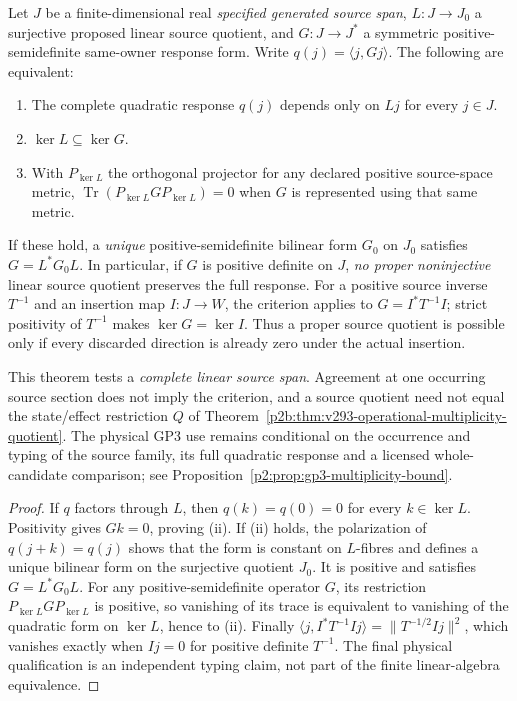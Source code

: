 \documentclass[11pt,a4paper]{article}
\begin{document}
\begin{theorem}
\label{p2f:thm:v296-source-quadratic-quotient}
Let $J$ be a finite-dimensional real \emph{specified generated source
span}, $L:J\to J_0$ a surjective proposed linear source quotient, and
$G:J\to J^*$ a symmetric positive-semidefinite same-owner response
form. Write $q(j)=\langle j,Gj\rangle$. The following are equivalent:
\begin{enumerate}[label=(\roman*),leftmargin=2em]
\item The complete quadratic response $q(j)$ depends only on $Lj$
for every $j\in J$.
\item $\ker L\subseteq\ker G$.
\item With $P_{\ker L}$ the orthogonal projector for any declared
positive source-space metric,
$\operatorname{Tr}(P_{\ker L}GP_{\ker L})=0$
when $G$ is represented using that same metric.
\end{enumerate}
If these hold, a \emph{unique} positive-semidefinite bilinear form
$G_0$ on $J_0$ satisfies $G=L^*G_0L$. In particular, if $G$ is
positive definite on $J$, \emph{no proper noninjective} linear source
quotient preserves the full response. For a positive source inverse
$T^{-1}$ and an insertion map $I:J\to W$, the criterion applies to
$G=I^*T^{-1}I$; strict positivity of $T^{-1}$ makes
$\ker G=\ker I$. Thus a proper source quotient is possible only if
every discarded direction is already zero under the actual insertion.

This theorem tests a \emph{complete linear source span}. Agreement at
one occurring source section does not imply the criterion, and a
source quotient need not equal the state/effect restriction $Q$ of
Theorem~\ref{p2b:thm:v293-operational-multiplicity-quotient}.
The physical GP3 use remains conditional on the occurrence and typing
of the source family, its full quadratic response and a licensed
whole-candidate comparison; see
Proposition~\ref{p2:prop:gp3-multiplicity-bound}.
\end{theorem}
\begin{proof}
If $q$ factors through $L$, then $q(k)=q(0)=0$ for every
$k\in\ker L$. Positivity gives $Gk=0$, proving (ii). If (ii)
holds, the polarization of $q(j+k)=q(j)$ shows that the form is
constant on $L$-fibres and defines a unique bilinear form on the
surjective quotient $J_0$. It is positive and satisfies
$G=L^*G_0L$. For any positive-semidefinite operator $G$, its
restriction $P_{\ker L}GP_{\ker L}$ is positive, so vanishing of
its trace is equivalent to vanishing of the quadratic form on
$\ker L$, hence to (ii). Finally
$\langle j,I^*T^{-1}Ij\rangle=\|T^{-1/2}Ij\|^2$,
which vanishes exactly when $Ij=0$ for positive definite $T^{-1}$.
The final physical qualification is an independent typing claim, not
part of the finite linear-algebra equivalence.
\end{proof}
\end{document}
